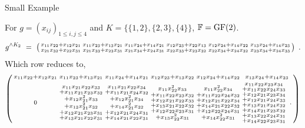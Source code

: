 \documentclass[9pt]{beamer}
\theoremstyle{definition}
\begin{document}
\begin{frame}[fragile]{Small Example}
\begin{example}
  For $g = (x_{ij})_{1\leq i, j\leq 4}$ and $K = \{ \{1, 2\}, \{2, 3\}, \{4\}\}$, ${\mathbb F} = \operatorname{GF}(2)$.
  \[
    g^{\wedge K_2} \ = \ \begin{psmallmatrix} x_{11}x_{22} + x_{12}x_{21} & x_{11}x_{23} + x_{13}x_{21} & x_{11}x_{24} + x_{14}x_{21} &  x_{12}x_{23} + x_{22}x_{13} &  x_{12}x_{24}+ x_{14}x_{22} &  x_{13}x_{24} + x_{14}x_{23} \\  x_{21}x_{32} + x_{22}x_{31} & x_{21}x_{33} + x_{23}x_{31} & x_{21}x_{34} + x_{24}x_{31} & x_{22}x_{33} + x_{23}x_{32} & x_{22}x_{34} + x_{24}x_{32} & x_{23}x_{34} + x_{24}x_{33}\end{psmallmatrix} \enspace.
  \]
  Which row reduces to, 
  \[
    \begin{psmallmatrix} x_{11}x_{22} + x_{12}x_{21} & x_{11}x_{23} + x_{13}x_{21} & x_{11}x_{24} + x_{14}x_{21} &  x_{12}x_{23} + x_{13}x_{22} &  x_{12}x_{24}+ x_{14}x_{22} &  x_{13}x_{24} + x_{14}x_{23} \\[3pt]
      0 & \substack{x_{11}x_{21}x_{22}x_{33} \\ + x_{11}x_{21}x_{23}x_{32} \\ + x_{12}x_{21}^2x_{33} \\+ x_{13}x_{21}^2x_{32} \\ + x_{12}x_{21}x_{23}x_{31} \\ + x_{13}x_{21}x_{22}x_{31}} & \substack{x_{11}x_{21}x_{22}x_{34} \\+ x_{11}x_{21}x_{24}x_{32} \\ + x_{12}x_{21}^2x_{34} \\+ x_{14}x_{21}^2x_{32} \\ + x_{12}x_{21}x_{24}x_{31} \\+ x_{14}x_{21}x_{22}x_{31}} & \substack{x_{11}x_{22}^2x_{33} \\+ x_{11}x_{22}x_{23}x_{32} \\+ x_{12}x_{21}x_{22}x_{33} \\+ x_{13}x_{21}x_{22}x_{32} \\+ x_{12}x_{22}x_{23}x_{31} \\+ x_{13}x_{22}^2x_{31}} & \substack{x_{11}x_{22}^2x_{34} \\+ x_{11}x_{22}x_{24}x_{32} \\+ x_{12}x_{21}x_{22}x_{34} \\+ x_{14}x_{21}x_{22}x_{32} \\+ x_{12}x_{22}x_{24}x_{31} \\+ x_{14}x_{22}^2x_{31}} & \substack{x_{11}x_{22}x_{23}x_{34} \\+ x_{11}x_{22}x_{24}x_{33} \\+ x_{12}x_{21}x_{23}x_{34} \\+ x_{12}x_{21}x_{24}x_{33} \\+ x_{13}x_{21}x_{24}x_{32} \\+ x_{14}x_{21}x_{23}x_{32} \\+ x_{13}x_{22}x_{24}x_{31} \\+ x_{14}x_{22}x_{23}x_{31}} \enspace .
    \end{psmallmatrix} 
  \]


\end{example}
\end{frame}
\end{document}
